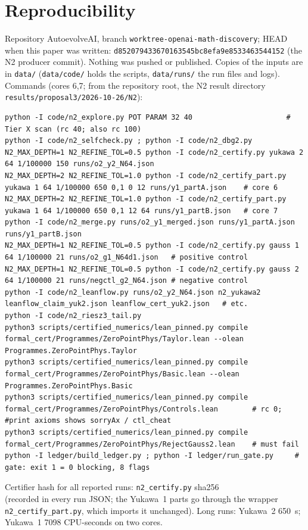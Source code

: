 \documentclass[10pt]{article}
\begin{document}
\section{Reproducibility}\label{sec:repro}
Repository AutoevolveAI, branch \texttt{worktree-openai-math-discovery}; HEAD when this paper was written: \texttt{d852079433670163545bc8efa9e8533463544152} (the N2 producer commit). Nothing was pushed or published. Copies of the inputs are in \texttt{data/} (\texttt{data/code/} holds the scripts, \texttt{data/runs/} the run files and logs). Commands (cores 6,7; from the repository root, the N2 result directory \texttt{results/proposal3/2026-10-26/N2}):
\begin{lstlisting}[basicstyle=\ttfamily\scriptsize]
python -I code/n2_explore.py POT PARAM 32 40                      # Tier X scan (rc 40; also rc 100)
python -I code/n2_selfcheck.py ; python -I code/n2_dbg2.py
N2_MAX_DEPTH=1 N2_REFINE_TOL=0.5 python -I code/n2_certify.py yukawa 2 64 1/100000 150 runs/o2_y2_N64.json
N2_MAX_DEPTH=2 N2_REFINE_TOL=1.0 python -I code/n2_certify_part.py yukawa 1 64 1/100000 650 0,1 0 12 runs/y1_partA.json    # core 6
N2_MAX_DEPTH=2 N2_REFINE_TOL=1.0 python -I code/n2_certify_part.py yukawa 1 64 1/100000 650 0,1 12 64 runs/y1_partB.json   # core 7
python -I code/n2_merge.py runs/o2_y1_merged.json runs/y1_partA.json runs/y1_partB.json
N2_MAX_DEPTH=1 N2_REFINE_TOL=0.5 python -I code/n2_certify.py gauss 1 64 1/100000 21 runs/o2_g1_N64d1.json   # positive control
N2_MAX_DEPTH=1 N2_REFINE_TOL=0.5 python -I code/n2_certify.py gauss 2 64 1/100000 21 runs/negctl_g2_N64.json # negative control
python -I code/n2_leanflow.py runs/o2_y2_N64.json n2_yukawa2 leanflow_claim_yuk2.json leanflow_cert_yuk2.json   # etc.
python -I code/n2_riesz3_tail.py
python3 scripts/certified_numerics/lean_pinned.py compile formal_cert/Programmes/ZeroPointPhys/Taylor.lean --olean Programmes.ZeroPointPhys.Taylor
python3 scripts/certified_numerics/lean_pinned.py compile formal_cert/Programmes/ZeroPointPhys/Basic.lean --olean Programmes.ZeroPointPhys.Basic
python3 scripts/certified_numerics/lean_pinned.py compile formal_cert/Programmes/ZeroPointPhys/Controls.lean        # rc 0; #print axioms shows sorryAx / ctl_cheat
python3 scripts/certified_numerics/lean_pinned.py compile formal_cert/Programmes/ZeroPointPhys/RejectGauss2.lean    # must fail
python -I ledger/build_ledger.py ; python -I ledger/run_gate.py     # gate: exit 1 = 0 blocking, 8 flags
\end{lstlisting}
Certifier hash for all reported runs: \texttt{n2\_certify.py} sha256 \\ (recorded in every run JSON; the Yukawa~1 parts go through the wrapper \texttt{n2\_certify\_part.py}, which imports it unchanged). Long runs: Yukawa~2 650~s; Yukawa~1 7098 CPU-seconds on two cores.
\end{document}
